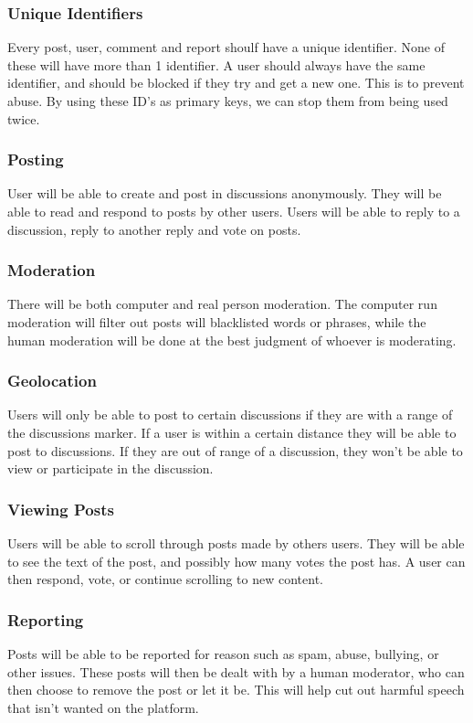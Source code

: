 \documentclass[12pt]{article}
\begin{document}
\subsubsection{Unique Identifiers}
Every post, user, comment and report shoulf have a unique identifier.  None of these will have more than 1 identifier.  A user  should always have the same identifier, and should be blocked if they try and get a new one.  This is to prevent abuse.  By using these ID's as primary keys, we can stop them from being used twice.
\subsubsection{Posting}
User will be able to create and post in discussions anonymously.  They will be able to read and respond to posts by other users.  Users will be able to reply to a discussion, reply to another reply and vote on posts.
\subsubsection{Moderation}
There will be both computer and real person moderation.  The computer run moderation will filter out posts will blacklisted words or phrases, while the human moderation will be done at the best judgment of whoever is moderating.
\subsubsection{Geolocation}
Users will only be able to post to certain discussions if they are with a range of the discussions marker.  If a user is within a certain distance they will be able to post to discussions.  If they are out of range of a discussion, they won’t be able to view or participate in the discussion.
\subsubsection{Viewing Posts}
Users will be able to scroll through posts made by others users.  They will be able to see the text of the post, and possibly how many votes the post has.  A user can then respond, vote, or continue scrolling to new content.
\subsubsection{Reporting}
Posts will be able to be reported for reason such as spam, abuse, bullying, or other issues.  These posts will then be dealt with by a human moderator, who can then choose to remove the post or let it be.  This will help cut out harmful speech that isn’t wanted on the platform.
\end{document}
